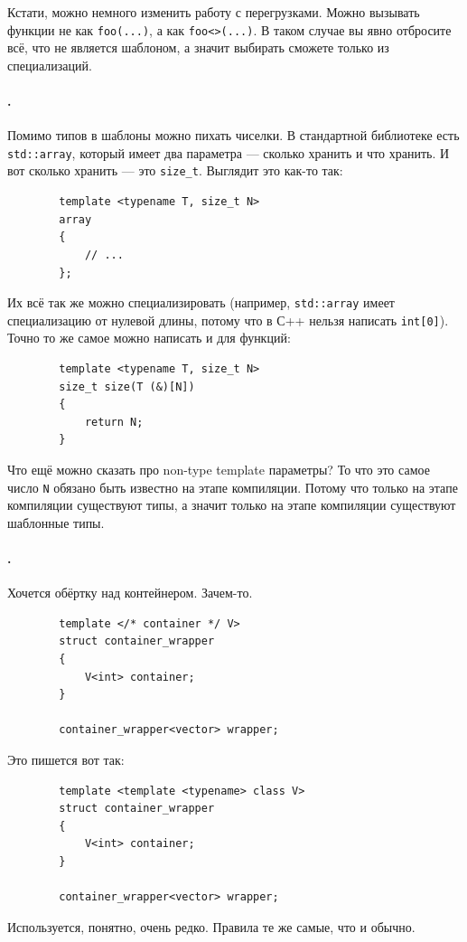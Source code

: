 \documentclass{article}
\begin{document}
    Кстати, можно немного изменить работу с перегрузками. Можно вызывать функции не как \texttt{foo(...)}, а как \texttt{foo<>(...)}. В таком случае вы явно отбросите всё, что не является шаблоном, а значит выбирать сможете только из специализаций.
    \paragraph{.}
    Помимо типов в шаблоны можно пихать чиселки. В стандартной библиотеке есть \texttt{std::array}, который имеет два параметра --- сколько хранить и что хранить. И вот сколько хранить --- это \texttt{size_t}. Выглядит это как-то так:
    \begin{verbatim}
        template <typename T, size_t N>
        array
        {
            // ...
        };
    \end{verbatim}
    Их всё так же можно специализировать (например, \texttt{std::array} имеет специализацию от нулевой длины, потому что в С++ нельзя написать \texttt{int[0]}). Точно то же самое можно написать и для функций:
    \begin{verbatim}
        template <typename T, size_t N>
        size_t size(T (&)[N])
        {
            return N;
        }
    \end{verbatim}
    Что ещё можно сказать про non-type template параметры? То что это самое число \texttt{N} обязано быть известно на этапе компиляции. Потому что только на этапе компиляции существуют типы, а значит только на этапе компиляции существуют шаблонные типы.
    \paragraph{.}
    Хочется обёртку над контейнером. Зачем-то.
    \begin{verbatim}
        template </* container */ V>
        struct container_wrapper
        {
            V<int> container;
        }

        container_wrapper<vector> wrapper;
    \end{verbatim}
    Это пишется вот так:
    \begin{verbatim}
        template <template <typename> class V>
        struct container_wrapper
        {
            V<int> container;
        }
        
        container_wrapper<vector> wrapper;
    \end{verbatim}
    Используется, понятно, очень редко. Правила те же самые, что и обычно.
\end{document}
